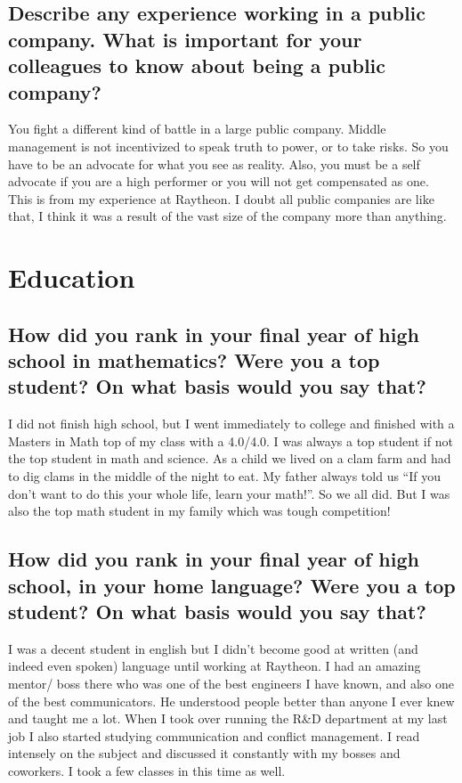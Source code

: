 \documentclass[letter,12pt]{article}
\begin{document}
\subsection{Describe any experience working in a public company. What is important for your colleagues to know about being a public company?}
You fight a different kind of battle in a large public company. Middle management is not incentivized to speak truth to power, or to take risks. So you have to be an advocate for what you see as reality. Also, you must be a self advocate if you are a high performer or you will not get compensated as one. This is from my experience at Raytheon. I doubt all public companies are like that, I think it was a result of the vast size of the company more than anything.

\section{Education}

\subsection{How did you rank in your final year of high school in mathematics? Were you a top student? On what basis would you say that?}
I did not finish high school, but I went immediately to college and finished with a Masters in Math top of my class with a 4.0/4.0. I was always a top student if not the top student in math and science. As a child we lived on a clam farm and had to dig clams in the middle of the night to eat. My father always told us ``If you don't want to do this your whole life, learn your math!''. So we all did. But I was also the top math student in my family which was tough competition!

\subsection{How did you rank in your final year of high school, in your home language? Were you a top student? On what basis would you say that?}
I was a decent student in english but I didn't become good at written (and indeed even spoken) language until working at Raytheon. I had an amazing mentor/ boss there who was one of the best engineers I have known, and also one of the best communicators. He understood people better than anyone I ever knew and taught me a lot. When I took over running the R\&D department at my last job I also started studying communication and conflict management. I read intensely on the subject and discussed it constantly with my bosses and coworkers. I took a few classes in this time as well.
\end{document}

